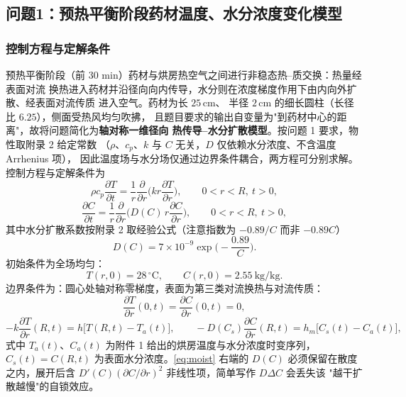 \subsection{问题1：预热平衡阶段药材温度、水分浓度变化模型}

\subsubsection{控制方程与定解条件}

预热平衡阶段（前 30 min）药材与烘房热空气之间进行非稳态热--质交换：热量经表面对流
换热进入药材并沿径向向内传导，水分则在浓度梯度作用下由内向外扩散、经表面对流传质
进入空气\cite{yan2026heat,srikiatden2007moisture}。药材为长 $25\,\mathrm{cm}$、
半径 $2\,\mathrm{cm}$ 的细长圆柱（长径比 $6.25$），侧面受热风均匀吹拂，
且题目要求的输出自变量为"到药材中心的距离"，故将问题简化为\textbf{轴对称一维径向
热传导--水分扩散模型}。按问题 1 要求，物性取附录 2 给定常数
（$\rho$、$c_p$、$k$ 与 $C$ 无关，$D$ 仅依赖水分浓度、不含温度 Arrhenius 项），
因此温度场与水分场仅通过边界条件耦合，两方程可分别求解。控制方程与定解条件为
\begin{equation}
  \rho c_p\frac{\partial T}{\partial t}
  =\frac{1}{r}\frac{\partial}{\partial r}\Big(k r\frac{\partial T}{\partial r}\Big),
  \qquad 0<r<R,\ t>0,
  \label{eq:heat}
\end{equation}
\begin{equation}
  \frac{\partial C}{\partial t}
  =\frac{1}{r}\frac{\partial}{\partial r}\Big(D(C)\,r\frac{\partial C}{\partial r}\Big),
  \qquad 0<r<R,\ t>0,
  \label{eq:moist}
\end{equation}
其中水分扩散系数按附录 2 取经验公式（注意指数为 $-0.89/C$ 而非 $-0.89C$）
\begin{equation}
  D(C)=7\times10^{-9}\exp\!\Big(-\frac{0.89}{C}\Big).
  \label{eq:D}
\end{equation}
初始条件为全场均匀：
\begin{equation}
  T(r,0)=28\,^{\circ}\mathrm{C},\qquad C(r,0)=2.55\ \mathrm{kg/kg}.
  \label{eq:ic}
\end{equation}
边界条件为：圆心处轴对称零梯度，表面为第三类对流换热与对流传质：
\begin{equation}
  \frac{\partial T}{\partial r}(0,t)=\frac{\partial C}{\partial r}(0,t)=0,
  \label{eq:bc0}
\end{equation}
\begin{equation}
  -k\frac{\partial T}{\partial r}(R,t)=h\big[T(R,t)-T_a(t)\big],
  \qquad
  -D(C_s)\frac{\partial C}{\partial r}(R,t)=h_m\big[C_s(t)-C_a(t)\big],
  \label{eq:bcR}
\end{equation}
式中 $T_a(t)$、$C_a(t)$ 为附件 1 给出的烘房温度与水分浓度时变序列，$C_s(t)=C(R,t)$
为表面水分浓度。\eqref{eq:moist} 右端的 $D(C)$ 必须保留在散度之内，展开后含
$D'(C)(\partial C/\partial r)^2$ 非线性项，简单写作 $D\Delta C$ 会丢失该
"越干扩散越慢"的自锁效应。

